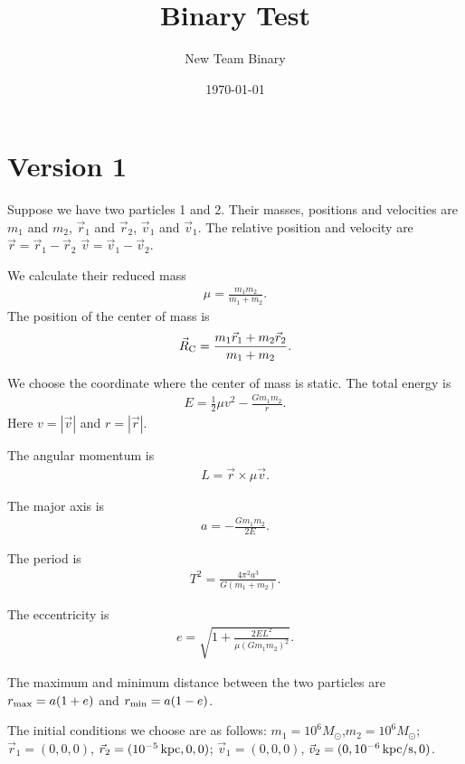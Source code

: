 \documentclass[a4paper,12pt]{article}
\title{Binary Test}
\author{New Team Binary}
\date{\today}
\begin{document}
\maketitle
\section{Version 1}
Suppose we have two particles 1 and 2. Their masses, positions and velocities are $m_1$ and $m_2$, $\vec{r}_1$ and $\vec{r}_2$, $\vec{v}_1$ and $\vec{v}_1$. The relative position and velocity are $\vec{r}=\vec{r}_1-\vec{r}_2$ $\vec{v}=\vec{v}_1-\vec{v}_2$.

We calculate their reduced mass 
\begin{align}
    \mu=\frac{m_1 m_2}{m_1 +m_2}.
\end{align} 
The position of the center of mass is 
\begin{align}
    \vec{R}_{\rm C}=\frac{m_1 \vec{r}_1+m_2 \vec{r}_2}{m_1+m_2}.
\end{align}

We choose the coordinate where the center of mass is static.
The total energy is 
\begin{align}
     E=\frac{1}{2}\mu v^2-\frac{G m_1 m_2}{r}.\label{eq_Etot}
\end{align}
Here $v=|\vec{v}|$ and $r=|\vec{r}|$.

The angular momentum is 
\begin{align}
    L=\vec{r}\times \mu \vec{v}.
\end{align}

The major axis is
\begin{align}
    a=-\frac{G m_1 m_2}{2E}.
\end{align}

The period is 
\begin{align}
    T^2=\frac{4 \pi^2 a^3}{G(m_1+m_2)}.
\end{align}
    
The eccentricity is 
\begin{align}
    e=\sqrt{1+\frac{2EL^2}{\mu(Gm_1m_2)^2}}.\label{eq_eccen}
\end{align}

The maximum and minimum distance between the two particles are $r_{\rm max}=a(1+e)$ and $r_{\rm min}=a(1-e)$.

The initial conditions we choose are as follows:
$m_1=10^{6}M_{\odot}$,$m_2=10^{6}M_{\odot}$; $\vec{r}_1=(0,0,0)$, $\vec{r}_2=(10^{-5}\,{\rm kpc},0,0)$; $\vec{v}_1=(0,0,0)$, $\vec{v}_2=(0, 10^{-6}\, {\rm kpc/s},0)$.
\end{document}
